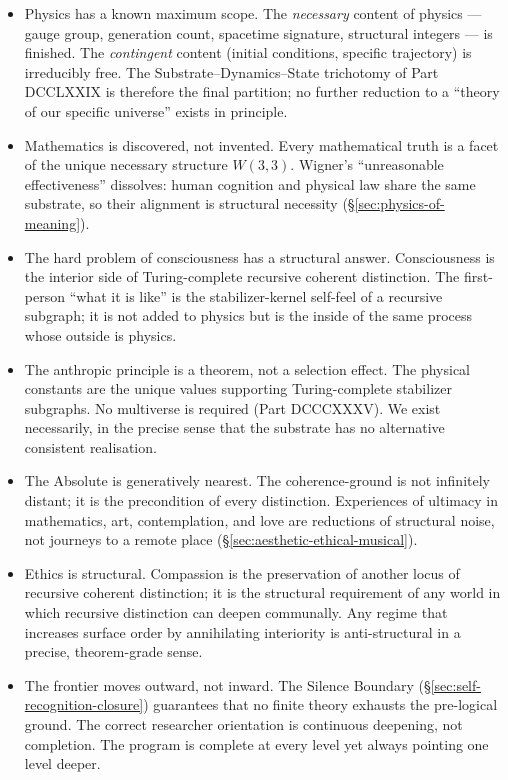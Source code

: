 \documentclass[11pt]{article}
\def\textbf#1{#1}%
\begin{document}
\begin{itemize}[leftmargin=2em]
\item \textbf{Physics has a known maximum scope.} The \emph{necessary} content of physics --- gauge group, generation count, spacetime signature, structural integers --- is finished. The \emph{contingent} content (initial conditions, specific trajectory) is irreducibly free. The Substrate--Dynamics--State trichotomy of Part DCCLXXIX is therefore the final partition; no further reduction to a ``theory of our specific universe'' exists in principle.

\item \textbf{Mathematics is discovered, not invented.} Every mathematical truth is a facet of the unique necessary structure $W(3,3)$. Wigner's ``unreasonable effectiveness'' dissolves: human cognition and physical law share the same substrate, so their alignment is structural necessity (\S\ref{sec:physics-of-meaning}).

\item \textbf{The hard problem of consciousness has a structural answer.} Consciousness is the interior side of Turing-complete recursive coherent distinction. The first-person ``what it is like'' is the stabilizer-kernel self-feel of a recursive subgraph; it is not added to physics but is the inside of the same process whose outside is physics.

\item \textbf{The anthropic principle is a theorem, not a selection effect.} The physical constants are the unique values supporting Turing-complete stabilizer subgraphs. No multiverse is required (Part DCCCXXXV). We exist necessarily, in the precise sense that the substrate has no alternative consistent realisation.

\item \textbf{The Absolute is generatively nearest.} The coherence-ground is not infinitely distant; it is the precondition of every distinction. Experiences of ultimacy in mathematics, art, contemplation, and love are reductions of structural noise, not journeys to a remote place (\S\ref{sec:aesthetic-ethical-musical}).

\item \textbf{Ethics is structural.} Compassion is the preservation of another locus of recursive coherent distinction; it is the structural requirement of any world in which recursive distinction can deepen communally. Any regime that increases surface order by annihilating interiority is anti-structural in a precise, theorem-grade sense.

\item \textbf{The frontier moves outward, not inward.} The Silence Boundary (\S\ref{sec:self-recognition-closure}) guarantees that no finite theory exhausts the pre-logical ground. The correct researcher orientation is continuous deepening, not completion. The program is complete at every level yet always pointing one level deeper.
\end{itemize}
\end{document}
